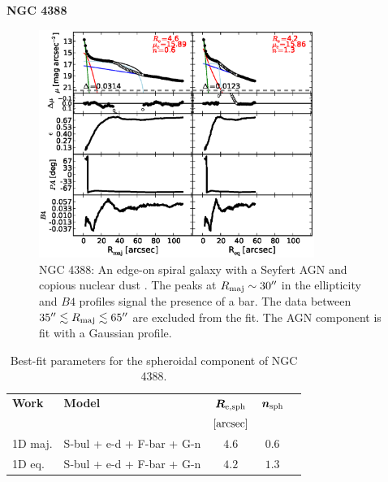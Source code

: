 \documentclass[preprint2]{emulateapj}
\newcommand{\fitfigurewidth}{0.8\textwidth}
\begin{document}
  \clearpage\newpage\noindent
  {\bf NGC 4388 \\}

  \begin{figure}[h]
  \begin{center}
  \includegraphics[width=\fitfigurewidth]{images/n4388_1Dfit.eps}
  \caption{NGC 4388: 
  An edge-on spiral galaxy with a Seyfert AGN \citep{veroncettyveron2006} 
  and copious nuclear dust \citep{martini2003}.
  The peaks at $R_{\rm maj} \sim 30''$ in the ellipticity and $B4$ profiles signal the presence of a bar.
  The data between $35'' \lesssim R_{\rm maj} \lesssim 65''$ are excluded from the fit.
  The AGN component is fit with a Gaussian profile.
  }
  \end{center}
  \end{figure}

  \begin{table}[h]
  \small
  \caption{Best-fit parameters for the spheroidal component of NGC 4388.}
  \begin{center}
  \begin{tabular}{llccc}
  \hline
  {\bf Work} & {\bf Model}   & $\bm R_{\rm e,sph}$    & $\bm n_{\rm sph}$ \\
    &  &  $[\rm arcsec]$ & \\
  \hline
  1D maj. & S-bul + e-d + F-bar + G-n & $4.6$  &  $0.6$ \\
  1D eq.  & S-bul + e-d + F-bar + G-n & $4.2$  &  $1.3$ \\
  \hline
  \end{tabular}
  \end{center}
  \label{tab:n4388}
  \end{table}
\end{document}
